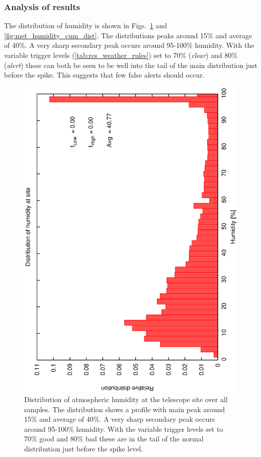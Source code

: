 \subsubsection{Analysis of results}
\label{ss:weather_anal}
The distribution of humidity is shown in Figs.~\ref{fig:met_humidity_dist} and \ref{fig:met_humidity_cum_dist}. The distributions peaks around 15\% and average of 40\%. A very sharp secondary peak occurs around 95-100\% humidity. With the variable trigger levels (\ref{tab:rcs_weather_rules}) set to 70\% (\emph{clear}) and 80\% (\emph{alert}) these can both be seen to be well into the tail of the main distribution just before the spike. This suggests that few false alerts should occur.

\begin{figure}[htbp]
  \begin{center}
    \includegraphics[scale=0.4, angle=-90]{figures/ecs/hum.dat.eps}
  \end{center}
  \caption[Relative distribution of humidity at telescope site.]
{Distribution of atmospheric humidity at the telescope site over all samples. The distribution shows a profile with main peak around 15\% and average of 40\%. A very sharp secondary peak occurs around 95-100\% humidity. With the variable trigger levels set to 70\% good and 80\% bad these are in the tail of the normal distribution just before the spike level.}
  \label{fig:met_humidity_dist}
\end{figure}
